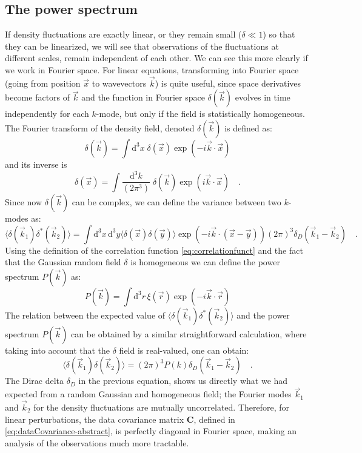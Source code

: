 \subsection{The power spectrum}

If density fluctuations are exactly linear, or they remain small ($\delta \ll 1$) so that they can be linearized,
we will see that observations of the fluctuations at different scales, remain independent of each other. 
We can see this more clearly if we work in Fourier space.
For linear equations, transforming into Fourier space (going from position $\vec x$ to wavevectors $\vec k$) is quite useful, 
since space derivatives become factors of $\vec k$ and the function in Fourier space $\delta(\vec k)$
evolves in time independently for each $k$-mode, but only if the field is statistically homogeneous.
The Fourier transform of the density field, denoted $\delta(\vec k)$ is defined as:
\begin{equation}
\delta(\vec k) = \int \mathrm{d}^3 x \; \delta(\vec x) \exp(-i \vec{k} \cdot \vec{x})
\end{equation}
and its inverse is
\begin{equation}
\delta(\vec x) = \int \frac{\mathrm{d}^3 k}{(2\pi^3)} \; \delta(\vec k) \exp(i \vec{k} \cdot \vec{x}) \quad .
\end{equation}
Since now $\delta(\vec k)$ can be complex, we can define the variance between two $k$-modes as:
\begin{equation}
\langle \delta (\vec{k}_1)  \delta^{*} (\vec{k}_2) \rangle = 
\int \mathrm{d}^3 x \, \mathrm{d}^3 y \langle \delta (\vec{x})  \delta (\vec{y}) \rangle \exp(-i \vec{k} \cdot (\vec{x}-\vec{y}) )
(2\pi)^3 \delta_{D}(\vec{k}_{1}-\vec{k}_{2})  \quad .
\end{equation}
Using the definition of the correlation function \ref{eq:correlationfunct} and the fact that the Gaussian random field $\delta$
is homogeneous we can define the power spectrum $P(\vec k)$ as:
\begin{equation}\label{eq:powerspectrum}
P(\vec k) = \int \mathrm{d}^3r \, \xi(\vec r) \exp(-i \vec{k} \cdot \vec{r})
\end{equation}
The relation between the expected value of $\langle \delta (\vec{k}_1)  \delta^{*} (\vec{k}_2) \rangle$ and the power spectrum $P(\vec k)$ can be obtained by a similar straightforward calculation,  where taking into account
that the $\delta$ field is real-valued, one can obtain:
\begin{equation}
\langle \delta (\vec{k}_1)  \delta (\vec{k}_2) \rangle = (2\pi)^3  P(k) \delta_{D}(\vec{k}_{1}-\vec{k}_{2}) \quad .
\end{equation}
The Dirac delta $\delta_D$ in the previous equation, shows us directly what we had expected from a random Gaussian and homogeneous field;
the Fourier modes $\vec{k}_1$ and $\vec{k}_2$ for the density fluctuations are mutually uncorrelated.
Therefore, for linear perturbations, the data covariance matrix $\mathbf{C}$, defined in \cref{eq:dataCovariance-abstract},
is perfectly diagonal in Fourier space, making an analysis of the observations much more tractable.

